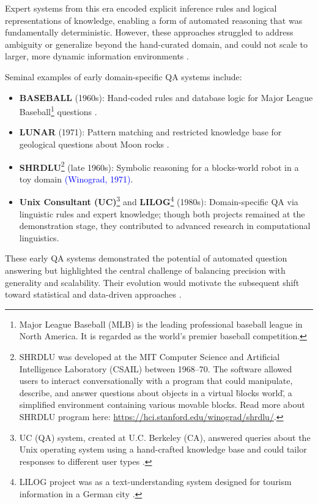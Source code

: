 \begin{spacing}{1.5}
Expert systems from this era encoded explicit inference rules and logical representations of knowledge, enabling a form of automated reasoning that was fundamentally deterministic. However, these approaches struggled to address ambiguity or generalize beyond the hand-curated domain, and could not scale to larger, more dynamic information environments \citep{noauthor_question_2025, jurafsky_chapter_2024}.

Seminal examples of early domain-specific QA systems include:
\begin{itemize}
    \item \textbf{BASEBALL} (1960s): Hand-coded rules and database logic for Major League Baseball\footnote{Major League Baseball (MLB) is the leading professional baseball league in North America. It is regarded as the world’s premier baseball competition.} questions \citep{green_baseball_1961}.
    \item \textbf{LUNAR} (1971): Pattern matching and restricted knowledge base for geological questions about Moon rocks \citep{woods_lunar_1972}.
    \item \textbf{SHRDLU}\footnote{SHRDLU was developed at the MIT Computer Science and Artificial Intelligence Laboratory (CSAIL) between 1968--70. The software allowed users to interact conversationally with a program that could manipulate, describe, and answer questions about objects in a virtual \"blocks world\", a simplified environment containing various movable blocks. Read more about SHRDLU program here: \url{https://hci.stanford.edu/winograd/shrdlu/}.} (late 1960s): Symbolic reasoning for a blocks-world robot in a toy domain \textcolor{blue}{(Winograd, 1971)}.
    \item \textbf{Unix Consultant (UC)}\footnote{UC (QA) system, created at U.C. Berkeley (CA), answered queries about the Unix operating system using a hand-crafted knowledge base and could tailor responses to different user types \citep{robert_berkeley_1988}.}  and \textbf{LILOG}\footnote{LILOG project was as a text-understanding system designed for tourism information in a German city \citep{noauthor_question_2025}.} (1980s): Domain-specific QA via linguistic rules and expert knowledge; though both projects remained at the demonstration stage, they contributed to advanced research in computational linguistics.
\end{itemize}

These early QA systems demonstrated the potential of automated question answering but highlighted the central challenge of balancing precision with generality and scalability. Their evolution would motivate the subsequent shift toward statistical and data-driven approaches \citep{jurafsky_chapter_2024, antoniou_survey_2022}.


\end{spacing}
